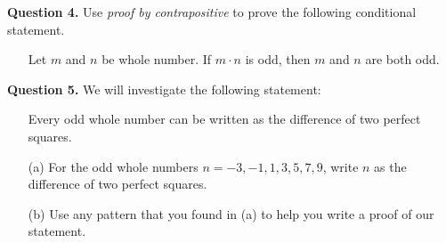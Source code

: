 \documentclass[10pt]{report}
\begin{document}
\noindent\textbf{Question 4.}  Use \emph{proof by contrapositive} to prove the following conditional statement.

\begin{itemize}

\item[] Let $m$ and $n$ be whole number.  If $m \cdot n$ is odd, then $m$ and $n$ are both odd.  

\end{itemize}

\medskip



\bigskip


\noindent\textbf{Question 5.}  We will investigate the following statement:

\begin{itemize}

\item[] Every odd whole number can be written as the difference of two perfect squares.  

\end{itemize}

\begin{itemize}

\item[(a)]  For the odd whole numbers $n = -3, -1, 1, 3, 5, 7, 9$, write $n$ as the difference of two perfect squares.

\item[(b)]  Use any pattern that you found in (a) to help you write a proof of our statement.  
\end{itemize}

\medskip
\end{document}
